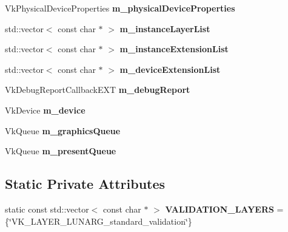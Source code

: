 \begin{DoxyCompactItemize}
Vk\+Physical\+Device\+Properties {\bfseries m\+\_\+physical\+Device\+Properties}
\item 
\mbox{\label{classflounder_1_1display_a5bf2d1e1b3baa54ee10ce4b84f0c3421}} 
std\+::vector$<$ const char $\ast$ $>$ {\bfseries m\+\_\+instance\+Layer\+List}
\item 
\mbox{\label{classflounder_1_1display_a259d83f4ff2f36e23bd355de57780e5c}} 
std\+::vector$<$ const char $\ast$ $>$ {\bfseries m\+\_\+instance\+Extension\+List}
\item 
\mbox{\label{classflounder_1_1display_a42979ff41024a90ad63145dc98af4d91}} 
std\+::vector$<$ const char $\ast$ $>$ {\bfseries m\+\_\+device\+Extension\+List}
\item 
\mbox{\label{classflounder_1_1display_afcc0bc0cdd1d453975cdcafc1e22808e}} 
Vk\+Debug\+Report\+Callback\+E\+XT {\bfseries m\+\_\+debug\+Report}
\item 
\mbox{\label{classflounder_1_1display_aff4a5bf98880db57a5c49e1d86b1d598}} 
Vk\+Device {\bfseries m\+\_\+device}
\item 
\mbox{\label{classflounder_1_1display_a1a0cd3d349e968c581b42a0df153182b}} 
Vk\+Queue {\bfseries m\+\_\+graphics\+Queue}
\item 
\mbox{\label{classflounder_1_1display_a1580740ccaaf29f302ee3ebeac4fa2e6}} 
Vk\+Queue {\bfseries m\+\_\+present\+Queue}
\end{DoxyCompactItemize}
\subsection*{Static Private Attributes}
\begin{DoxyCompactItemize}
\item 
\mbox{\label{classflounder_1_1display_aa14fccab78aa84daf5196fd6fc6bb7fb}} 
static const std\+::vector$<$ const char $\ast$ $>$ {\bfseries V\+A\+L\+I\+D\+A\+T\+I\+O\+N\+\_\+\+L\+A\+Y\+E\+RS} = \{\char`\"{}V\+K\+\_\+\+L\+A\+Y\+E\+R\+\_\+\+L\+U\+N\+A\+R\+G\+\_\+standard\+\_\+validation\char`\"{}\}
\end{DoxyCompactItemize}
